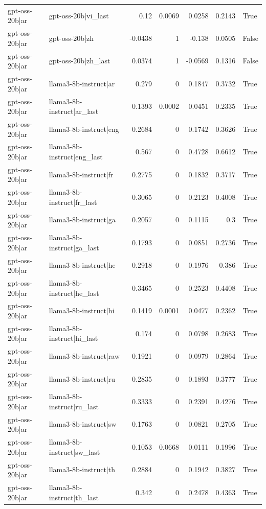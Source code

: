\begin{table}
\begin{tabular}{l l r r r r l}
gpt-oss-20b|ar & gpt-oss-20b|vi_last & 0.12 & 0.0069 & 0.0258 & 0.2143 & True \\
gpt-oss-20b|ar & gpt-oss-20b|zh & -0.0438 & 1 & -0.138 & 0.0505 & False \\
gpt-oss-20b|ar & gpt-oss-20b|zh_last & 0.0374 & 1 & -0.0569 & 0.1316 & False \\
gpt-oss-20b|ar & llama3-8b-instruct|ar & 0.279 & 0 & 0.1847 & 0.3732 & True \\
gpt-oss-20b|ar & llama3-8b-instruct|ar_last & 0.1393 & 0.0002 & 0.0451 & 0.2335 & True \\
gpt-oss-20b|ar & llama3-8b-instruct|eng & 0.2684 & 0 & 0.1742 & 0.3626 & True \\
gpt-oss-20b|ar & llama3-8b-instruct|eng_last & 0.567 & 0 & 0.4728 & 0.6612 & True \\
gpt-oss-20b|ar & llama3-8b-instruct|fr & 0.2775 & 0 & 0.1832 & 0.3717 & True \\
gpt-oss-20b|ar & llama3-8b-instruct|fr_last & 0.3065 & 0 & 0.2123 & 0.4008 & True \\
gpt-oss-20b|ar & llama3-8b-instruct|ga & 0.2057 & 0 & 0.1115 & 0.3 & True \\
gpt-oss-20b|ar & llama3-8b-instruct|ga_last & 0.1793 & 0 & 0.0851 & 0.2736 & True \\
gpt-oss-20b|ar & llama3-8b-instruct|he & 0.2918 & 0 & 0.1976 & 0.386 & True \\
gpt-oss-20b|ar & llama3-8b-instruct|he_last & 0.3465 & 0 & 0.2523 & 0.4408 & True \\
gpt-oss-20b|ar & llama3-8b-instruct|hi & 0.1419 & 0.0001 & 0.0477 & 0.2362 & True \\
gpt-oss-20b|ar & llama3-8b-instruct|hi_last & 0.174 & 0 & 0.0798 & 0.2683 & True \\
gpt-oss-20b|ar & llama3-8b-instruct|raw & 0.1921 & 0 & 0.0979 & 0.2864 & True \\
gpt-oss-20b|ar & llama3-8b-instruct|ru & 0.2835 & 0 & 0.1893 & 0.3777 & True \\
gpt-oss-20b|ar & llama3-8b-instruct|ru_last & 0.3333 & 0 & 0.2391 & 0.4276 & True \\
gpt-oss-20b|ar & llama3-8b-instruct|sw & 0.1763 & 0 & 0.0821 & 0.2705 & True \\
gpt-oss-20b|ar & llama3-8b-instruct|sw_last & 0.1053 & 0.0668 & 0.0111 & 0.1996 & True \\
gpt-oss-20b|ar & llama3-8b-instruct|th & 0.2884 & 0 & 0.1942 & 0.3827 & True \\
gpt-oss-20b|ar & llama3-8b-instruct|th_last & 0.342 & 0 & 0.2478 & 0.4363 & True \\

\end{tabular}
\end{table}
